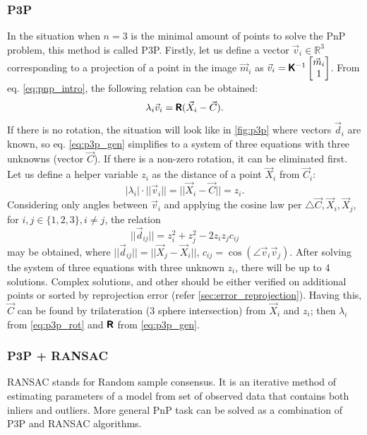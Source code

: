 \subsubsection{P3P}
In the situation when $n=3$ is the minimal amount of points to solve the PnP problem, this method is called P3P.  
Firstly, let us define a vector $\vec{v}_i \in \mathbb{R}^3$ corresponding to a projection of a point in the image $\vec{m}_i$ as $\vec{v}_i = \pmb{\mathsf{K}}^{-1}\begin{bmatrix}\vec{m}_i \\ 1 \end{bmatrix}$. From eq. \eqref{eq:pnp_intro}, the following relation can be obtained:
\begin{equation}
    \label{eq:p3p_gen}
    \lambda_i \vec{v}_i = \pmb{\mathsf{R}} (\vec{X}_i - \vec{C}).
\end{equation}
If there is no rotation, the situation will look like in \autoref{fig:p3p} where vectors $\vec{d}_i$ are known, so eq. \eqref{eq:p3p_gen} simplifies to a system of three equations with three unknowns (vector $\vec{C}$).
If there is a non-zero rotation, it can be eliminated first.
Let us define a helper variable $z_i$ as the distance of a point $\vec{X}_i$ from $\vec{C}_i$:
\begin{equation}
    \label{eq:p3p_rot}
    |\lambda_i| \cdot ||\vec{v}_i|| = || \vec{X}_i - \vec{C} || = z_i.
\end{equation}
Considering only angles between $\vec{v}_i$ and applying the cosine law per $\triangle{\vec{C}, \vec{X}_i, \vec{X}_j}$, for $i, j \in \{1, 2, 3\}, i \neq j$, the relation
\begin{equation}
    ||\vec{d}_{ij}|| = z_i^2 + z_j^2 - 2z_iz_jc_{ij}
\end{equation}
may be obtained, where $||\vec{d}_{ij}|| = || \vec{X}_j - \vec{X}_i ||$, $c_{ij} = \cos(\angle \vec{v}_i \vec{v}_j)$.
After solving the system of three equations with three unknown $z_i$, there will be up to 4 solutions.
Complex solutions, and other should be either verified on additional points \cite{Fischler1981} or sorted by reprojection error (refer \autoref{sec:error_reprojection}).
Having this, $\vec{C}$ can be found by trilateration (3 sphere intersection) from $\vec{X}_i$ and $z_i$; then $\lambda_i$ from \eqref{eq:p3p_rot} and $\pmb{\mathsf{R}}$ from \eqref{eq:p3p_gen}.

\subsubsection{P3P + RANSAC}
RANSAC stands for Random sample consensus. 
It is an iterative method of estimating parameters of a model from set of observed data that contains both inliers and outliers.
More general PnP task can be solved as a combination of P3P and RANSAC algorithms.

